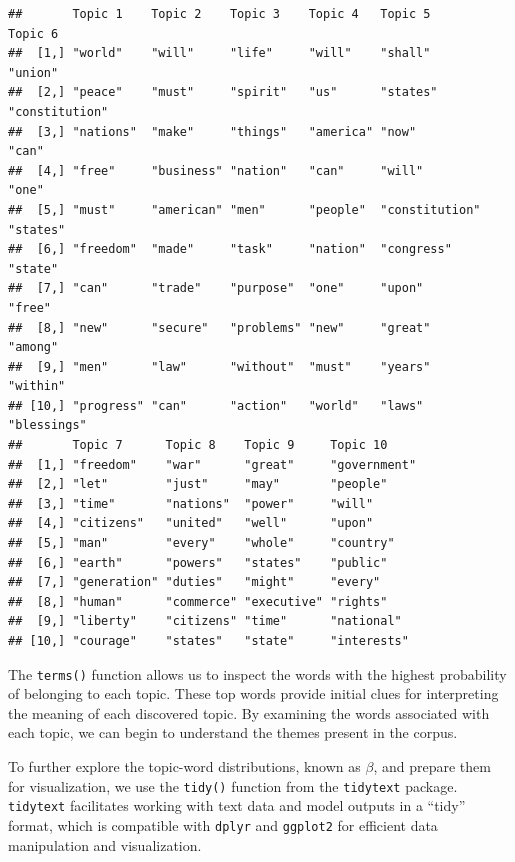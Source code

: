 \documentclass[
]{book}
\begin{document}
\begin{verbatim}
##       Topic 1    Topic 2    Topic 3    Topic 4   Topic 5        Topic 6       
##  [1,] "world"    "will"     "life"     "will"    "shall"        "union"       
##  [2,] "peace"    "must"     "spirit"   "us"      "states"       "constitution"
##  [3,] "nations"  "make"     "things"   "america" "now"          "can"         
##  [4,] "free"     "business" "nation"   "can"     "will"         "one"         
##  [5,] "must"     "american" "men"      "people"  "constitution" "states"      
##  [6,] "freedom"  "made"     "task"     "nation"  "congress"     "state"       
##  [7,] "can"      "trade"    "purpose"  "one"     "upon"         "free"        
##  [8,] "new"      "secure"   "problems" "new"     "great"        "among"       
##  [9,] "men"      "law"      "without"  "must"    "years"        "within"      
## [10,] "progress" "can"      "action"   "world"   "laws"         "blessings"   
##       Topic 7      Topic 8    Topic 9     Topic 10    
##  [1,] "freedom"    "war"      "great"     "government"
##  [2,] "let"        "just"     "may"       "people"    
##  [3,] "time"       "nations"  "power"     "will"      
##  [4,] "citizens"   "united"   "well"      "upon"      
##  [5,] "man"        "every"    "whole"     "country"   
##  [6,] "earth"      "powers"   "states"    "public"    
##  [7,] "generation" "duties"   "might"     "every"     
##  [8,] "human"      "commerce" "executive" "rights"    
##  [9,] "liberty"    "citizens" "time"      "national"  
## [10,] "courage"    "states"   "state"     "interests"
\end{verbatim}

The \texttt{terms()} function allows us to inspect the words with the highest probability of belonging to each topic.
These top words provide initial clues for interpreting the meaning of each discovered topic.
By examining the words associated with each topic, we can begin to understand the themes present in the corpus.

To further explore the topic-word distributions, known as \(\beta\), and prepare them for visualization, we use the \texttt{tidy()} function from the \texttt{tidytext} package.
\texttt{tidytext} facilitates working with text data and model outputs in a ``tidy'' format, which is compatible with \texttt{dplyr} and \texttt{ggplot2} for efficient data manipulation and visualization.
\end{document}
